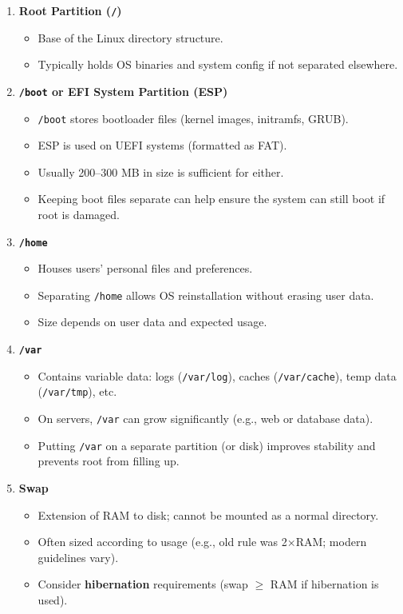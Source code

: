 \documentclass[12pt,a4paper]{report}
\begin{document}
\begin{enumerate}
    \item \textbf{Root Partition (\texttt{/})}
    \begin{itemize}
        \item Base of the Linux directory structure.
        \item Typically holds OS binaries and system config if not separated elsewhere.
    \end{itemize}

    \item \textbf{\texttt{/boot} or EFI System Partition (ESP)}
    \begin{itemize}
        \item \texttt{/boot} stores bootloader files (kernel images, initramfs, GRUB).
        \item ESP is used on UEFI systems (formatted as FAT).
        \item Usually 200–300 MB in size is sufficient for either.
        \item Keeping boot files separate can help ensure the system can still boot if root is damaged.
    \end{itemize}

    \item \textbf{\texttt{/home}}
    \begin{itemize}
        \item Houses users’ personal files and preferences.
        \item Separating \texttt{/home} allows OS reinstallation without erasing user data.
        \item Size depends on user data and expected usage.
    \end{itemize}

    \item \textbf{\texttt{/var}}
    \begin{itemize}
        \item Contains variable data: logs (\texttt{/var/log}), caches (\texttt{/var/cache}), temp data (\texttt{/var/tmp}), etc.
        \item On servers, \texttt{/var} can grow significantly (e.g., web or database data).
        \item Putting \texttt{/var} on a separate partition (or disk) improves stability and prevents root from filling up.
    \end{itemize}

    \item \textbf{Swap}
    \begin{itemize}
        \item Extension of RAM to disk; cannot be mounted as a normal directory.
        \item Often sized according to usage (e.g., old rule was 2×RAM; modern guidelines vary).
        \item Consider \textbf{hibernation} requirements (swap $\geq$ RAM if hibernation is used).
    \end{itemize}
\end{enumerate}
\end{document}
